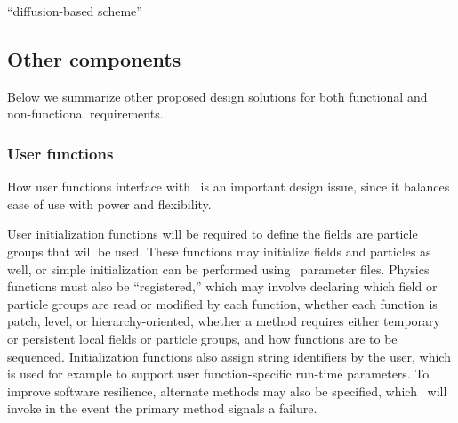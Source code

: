 \documentclass[10pt,twocolumn]{article}
\begin{document}

``diffusion-based scheme''

% 

\subsection{Other components} \label{ss:design-other}


Below we summarize other proposed design solutions for both functional
and non-functional requirements.

\subsubsection{User functions} \label{sss:design-user}

How user functions interface with \cello\ is an important design
issue, since it balances ease of use with power and flexibility.  

User initialization functions will be required to define the fields
are particle groups that will be used.  These functions may initialize
fields and particles as well, or simple initialization can be
performed using \cello\ parameter files.  Physics functions must also
be ``registered,'' which may involve declaring which field or particle
groups are read or modified by each function, whether each function is
patch, level, or hierarchy-oriented, whether a method requires
either temporary or persistent local fields or particle groups, and
how functions are to be sequenced.  Initialization functions also
assign string identifiers by the user, which is used for example to
support user function-specific run-time parameters.  To improve
software resilience, alternate methods may also be specified, which
\cello\ will invoke in the event the primary method signals a failure.
\end{document}
